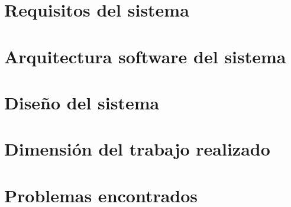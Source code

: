 \section{Requisitos del sistema}


\section{Arquitectura software del sistema}


\section{Diseño del sistema}


\section{Dimensión del trabajo realizado}


\section{Problemas encontrados}




